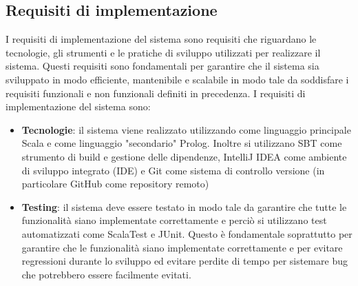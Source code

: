 \subsection{Requisiti di implementazione} \label{subsec:implementation_requirements}
I requisiti di implementazione del sistema sono requisiti che riguardano le tecnologie, gli strumenti e le pratiche di sviluppo
utilizzati per realizzare il sistema. Questi requisiti sono fondamentali per garantire che il sistema sia sviluppato in modo
efficiente, mantenibile e scalabile in modo tale da soddisfare i requisiti funzionali e non funzionali definiti in precedenza.
I requisiti di implementazione del sistema sono:
\begin{itemize}
    \item \textbf{Tecnologie}: il sistema viene realizzato utilizzando come linguaggio principale Scala e come 
    linguaggio "secondario" Prolog. Inoltre si utilizzano
    SBT come strumento di build e gestione delle dipendenze, IntelliJ IDEA come ambiente di sviluppo integrato (IDE) e Git come
    sistema di controllo versione (in particolare GitHub come repository remoto)
    \item \textbf{Testing}: il sistema deve essere testato in modo tale da garantire che tutte le funzionalità siano implementate
    correttamente e perciò si utilizzano test automatizzati come ScalaTest e JUnit. Questo è fondamentale soprattutto per garantire
    che le funzionalità siano implementate correttamente e per evitare regressioni durante lo sviluppo ed evitare perdite di tempo
    per sistemare bug che potrebbero essere facilmente evitati.
\end{itemize}
